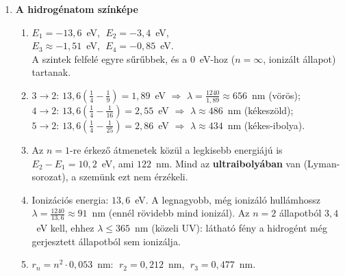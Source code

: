 \documentclass[11pt,a4paper]{article}
\begin{document}
\begin{enumerate}
\item \textbf{A hidrogénatom színképe}
  \begin{enumerate}
    \item
      \begin{minipage}[t]{0.5\linewidth}
      $E_1 = -13{,}6$~eV, $\;E_2 = -3{,}4$~eV,\\
      $E_3 \approx -1{,}51$~eV, $\;E_4 = -0{,}85$~eV.\\[3pt]
      A szintek felfelé egyre sűrűbbek, és a $0$~eV-hoz ($n = \infty$, ionizált állapot)
      tartanak.
      \end{minipage}\hfill
      \begin{minipage}[t]{0.42\linewidth}\vspace{0pt}\centering
      \end{minipage}
    \item $3\to2$: $13{,}6\left(\tfrac14 - \tfrac19\right) = 1{,}89$~eV $\Rightarrow$
      $\lambda = \tfrac{1240}{1{,}89} \approx 656$~nm (vörös);\\
      $4\to2$: $13{,}6\left(\tfrac14 - \tfrac1{16}\right) = 2{,}55$~eV $\Rightarrow$
      $\lambda \approx 486$~nm (kékeszöld);\\
      $5\to2$: $13{,}6\left(\tfrac14 - \tfrac1{25}\right) = 2{,}86$~eV $\Rightarrow$
      $\lambda \approx 434$~nm (kékes-ibolya).
    \item Az $n=1$-re érkező átmenetek közül a legkisebb energiájú is $E_2 - E_1 =
      10{,}2$~eV, ami $122$~nm. Mind az \textbf{ultraibolyában} van (Lyman-sorozat), a
      szemünk ezt nem érzékeli.
    \item Ionizációs energia: $13{,}6$~eV. A legnagyobb, még ionizáló hullámhossz
      $\lambda = \tfrac{1240}{13{,}6} \approx 91$~nm (ennél rövidebb mind ionizál).
      Az $n=2$ állapotból $3{,}4$~eV kell, ehhez $\lambda \le 365$~nm (közeli UV): látható
      fény a hidrogént még gerjesztett állapotból sem ionizálja.
    \item $r_n = n^2\cdot 0{,}053$~nm: $\;r_2 = 0{,}212$~nm, $\;r_3 = 0{,}477$~nm.
  \end{enumerate}


\end{enumerate}
\end{document}
